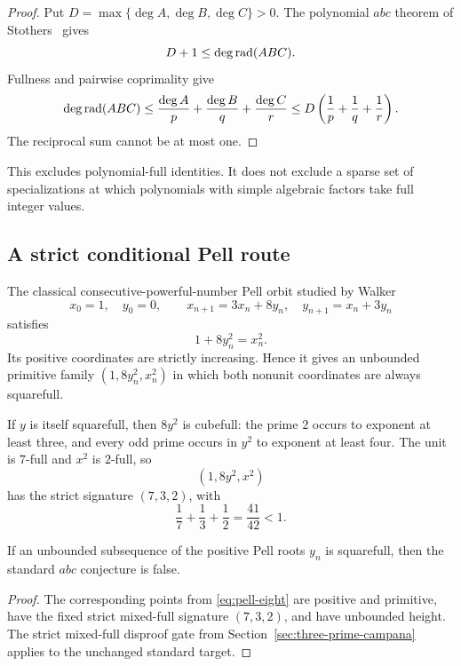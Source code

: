 \begin{proof}
Put $D=\max\{\deg A,\deg B,\deg C\}>0$.  The polynomial $abc$ theorem of
Stothers~\cite{Stothers1981} gives
\[
 D+1\leq\deg\operatorname{rad}(ABC).
\]
Fullness and pairwise coprimality give
\[
 \deg\operatorname{rad}(ABC)
 \leq\frac{\deg A}{p}+\frac{\deg B}{q}+\frac{\deg C}{r}
 \leq D\left(\frac1p+\frac1q+\frac1r\right).
\]
The reciprocal sum cannot be at most one.
\end{proof}

This excludes polynomial-full identities.  It does not exclude a sparse set
of specializations at which polynomials with simple algebraic factors take
full integer values.

\subsection{A strict conditional Pell route}

The classical consecutive-powerful-number Pell orbit studied by
Walker~\cite{Walker1976}
\[
 x_0=1,\quad y_0=0,\qquad
 x_{n+1}=3x_n+8y_n,\quad y_{n+1}=x_n+3y_n
\]
satisfies
\begin{equation}\label{eq:pell-eight}
                     1+8y_n^2=x_n^2.
\end{equation}
Its positive coordinates are strictly increasing.  Hence it gives an
unbounded primitive family $(1,8y_n^2,x_n^2)$ in which both nonunit
coordinates are always squarefull.

If $y$ is itself squarefull, then $8y^2$ is cubefull: the prime $2$ occurs
to exponent at least three, and every odd prime occurs in $y^2$ to exponent
at least four.  The unit is $7$-full and $x^2$ is $2$-full, so
\[
                         (1,8y^2,x^2)
\]
has the strict signature $(7,3,2)$, with
\[
                       \frac17+\frac13+\frac12=\frac{41}{42}<1.
\]

\begin{theorem}
\label{thm:pell-squarefull-disproof}
If an unbounded subsequence of the positive Pell roots $y_n$ is squarefull,
then the standard $abc$ conjecture is false.
\end{theorem}

\begin{proof}
The corresponding points from \eqref{eq:pell-eight} are positive and
primitive, have the fixed strict mixed-full signature $(7,3,2)$, and have
unbounded height.  The strict mixed-full disproof gate from
Section~\ref{sec:three-prime-campana} applies to the unchanged standard
target.
\end{proof}

